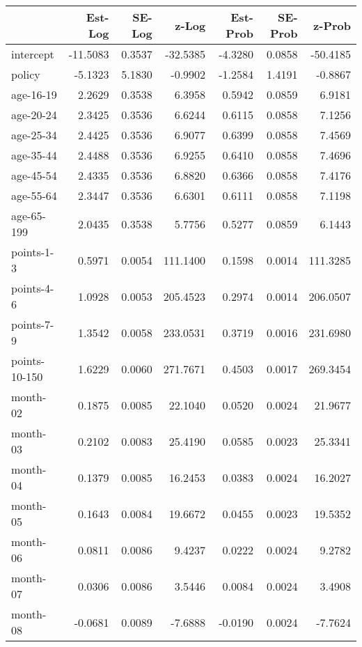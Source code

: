 \documentclass[10pt]{article}
\begin{document}

\begin{table}[ht]
\centering
\begin{tabular}{lrrrrrr}
  \hline
 & Est-Log & SE-Log & z-Log & Est-Prob & SE-Prob & z-Prob \\ 
  \hline
intercept & -11.5083 & 0.3537 & -32.5385 & -4.3280 & 0.0858 & -50.4185 \\ 
  policy & -5.1323 & 5.1830 & -0.9902 & -1.2584 & 1.4191 & -0.8867 \\ 
  age-16-19 & 2.2629 & 0.3538 & 6.3958 & 0.5942 & 0.0859 & 6.9181 \\ 
  age-20-24 & 2.3425 & 0.3536 & 6.6244 & 0.6115 & 0.0858 & 7.1256 \\ 
  age-25-34 & 2.4425 & 0.3536 & 6.9077 & 0.6399 & 0.0858 & 7.4569 \\ 
  age-35-44 & 2.4488 & 0.3536 & 6.9255 & 0.6410 & 0.0858 & 7.4696 \\ 
  age-45-54 & 2.4335 & 0.3536 & 6.8820 & 0.6366 & 0.0858 & 7.4176 \\ 
  age-55-64 & 2.3447 & 0.3536 & 6.6301 & 0.6111 & 0.0858 & 7.1198 \\ 
  age-65-199 & 2.0435 & 0.3538 & 5.7756 & 0.5277 & 0.0859 & 6.1443 \\ 
  points-1-3 & 0.5971 & 0.0054 & 111.1400 & 0.1598 & 0.0014 & 111.3285 \\ 
  points-4-6 & 1.0928 & 0.0053 & 205.4523 & 0.2974 & 0.0014 & 206.0507 \\ 
  points-7-9 & 1.3542 & 0.0058 & 233.0531 & 0.3719 & 0.0016 & 231.6980 \\ 
  points-10-150 & 1.6229 & 0.0060 & 271.7671 & 0.4503 & 0.0017 & 269.3454 \\ 
  month-02 & 0.1875 & 0.0085 & 22.1040 & 0.0520 & 0.0024 & 21.9677 \\ 
  month-03 & 0.2102 & 0.0083 & 25.4190 & 0.0585 & 0.0023 & 25.3341 \\ 
  month-04 & 0.1379 & 0.0085 & 16.2453 & 0.0383 & 0.0024 & 16.2027 \\ 
  month-05 & 0.1643 & 0.0084 & 19.6672 & 0.0455 & 0.0023 & 19.5352 \\ 
  month-06 & 0.0811 & 0.0086 & 9.4237 & 0.0222 & 0.0024 & 9.2782 \\ 
  month-07 & 0.0306 & 0.0086 & 3.5446 & 0.0084 & 0.0024 & 3.4908 \\ 
  month-08 & -0.0681 & 0.0089 & -7.6888 & -0.0190 & 0.0024 & -7.7624 \\ 

\end{tabular}
\end{table}
\end{document}
